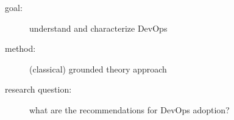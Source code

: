 \documentclass{beamer}
\begin{document}
\begin{frame}
\end{frame}

\begin{frame}

  \begin{description}
   \item[goal:] understand and characterize DevOps
   \item[method:] (classical) grounded theory approach
   \item[research question:] what are the recommendations for DevOps adoption?   
  \end{description}
\end{frame}

\begin{frame}
\end{frame}
\end{document}
